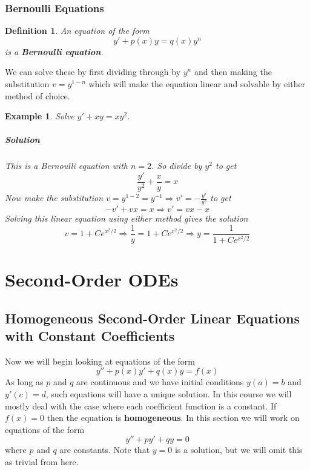 \documentclass[letterpaper, 11pt, openany]{book}
\theoremstyle{mytheoremstyle}
\newtheorem{definition}{Definition}[section]
\theoremstyle{myexamplestyle}
\newtheorem{example}{Example}[section]
\newenvironment{solution}{\paragraph{\sffamily \smaller \fontseries{b}\selectfont Solution}}{\hfill\faSquare}
\begin{document}
\subsection{Bernoulli Equations}

\begin{definition}\label{d:Bernoulli-eqn}
    An equation of the form
    \[y' + p(x)y = q(x)y^{n}\]
    is a \textbf{Bernoulli equation}.
\end{definition}    

We can solve these by first dividing through by \(y^{n}\) and then making the substitution \(v = y^{1-n}\) which will make the equation linear and solvable by either method of choice.

\begin{example}\label{e:de-Bernoulli}
    Solve \(y' + xy = xy^{2}\).
    \begin{solution}
        This is a Bernoulli equation with \(n=2\). So divide by \(y^{2}\) to get
        \[\frac{y'}{y^{2}} + \frac{x}{y} = x\]
        Now make the substitution \(v = y^{1-2} = y^{-1} \Rightarrow v' = -\frac{y'}{y^2}\) to get
        \[-v' + vx = x \Rightarrow v' = vx - x\]
        Solving this linear equation using either method gives the solution
        \[v = 1 + C e^{x^2/2} \Rightarrow \frac{1}{y} = 1 + C e^{x^2/2} \Rightarrow y= \frac{1}{1 + C e^{x^2/2}}\]
    \end{solution}
\end{example}

\newpage\thispagestyle{firstofchapter}
\chapter{Second-Order ODEs}
\section{Homogeneous Second-Order Linear Equations with Constant Coefficients}
\setcounter{figure}{0}
Now we will begin looking at equations of the form
\[y'' + p(x)y' + q(x)y = f(x)\]
As long as \(p\) and \(q\) are continuous and we have initial conditions \(y(a) = b\) and \(y'(c) = d\), such equations will have a unique solution. In this course we will mostly deal with the case where each coefficient function is a constant. If \(f(x) = 0\) then the equation is \textbf{homogeneous}. In this section we will work on equations of the form
\begin{equation}\label{eq:2nd-lin-hmgns-const-coeff}
    y'' + py' + qy = 0
\end{equation}
where \(p\) and \(q\) are constants. Note that \(y = 0\) is a solution, but we will omit this as trivial from here.
\end{document}
